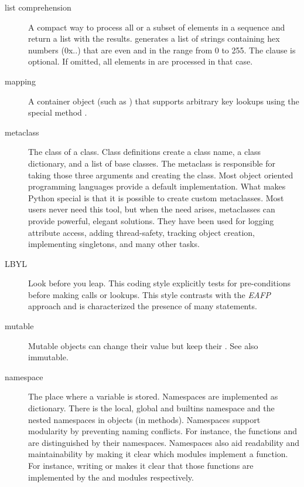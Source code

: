\begin{description}
\item[list comprehension]{A compact way to process all or a subset of elements
in a sequence and return a list with the results.   generates a list of strings
containing hex numbers (0x..) that are even and in the range from 0 to 255.
The  clause is optional.  If omitted, all elements in
{} are processed in that case.}

\item[mapping]{A container object (such as ) that supports
arbitrary key lookups using the special method .}

\item[metaclass]{The class of a class.  Class definitions create a class
name, a class dictionary, and a list of base classes.  The metaclass is
responsible for taking those three arguments and creating the class.  Most
object oriented programming languages provide a default implementation.
What makes Python special is that it is possible to create custom
metaclasses.  Most users never need this tool, but when the need arises,
metaclasses can provide powerful, elegant solutions.  They have been used
for logging attribute access, adding thread-safety, tracking object
creation, implementing singletons, and many other tasks.}

\item[LBYL]{Look before you leap.  This coding style explicitly tests for
pre-conditions before making calls or lookups.  This style contrasts with
the \emph{EAFP} approach and is characterized the presence of many
{} statements.}

\item[mutable]{Mutable objects can change their value but keep their
.  See also immutable.}

\item[namespace]{The place where a variable is stored.  Namespaces are
implemented as dictionary.  There is the local, global and builtins
namespace and the nested namespaces in objects (in methods).  Namespaces
support modularity by preventing naming conflicts.  For instance, the
functions  and  are
distinguished by their namespaces.  Namespaces also aid readability and
maintainability by making it clear which modules implement a function.  For
instance, writing  or 
makes it clear that those functions are implemented by the 
and  modules respectively.}


\end{description}
